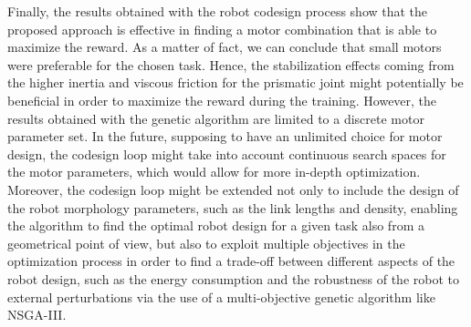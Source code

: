 Finally, the results obtained with the robot codesign process show that the proposed approach is effective in finding a motor combination that is able to maximize the reward. As a matter of fact, we can conclude that small motors were preferable for the chosen task. Hence, the stabilization effects coming from the higher inertia and viscous friction for the prismatic joint might potentially be beneficial in order to maximize the reward during the training. However, the results obtained with the genetic algorithm are limited to a discrete motor parameter set. In the future, supposing to have an unlimited choice for motor design, the codesign loop might take into account continuous search spaces for the motor parameters, which would allow for more in-depth optimization. Moreover, the codesign loop might be extended not only to include the design of the robot morphology parameters, such as the link lengths and density, enabling the algorithm to find the optimal robot design for a given task also from a geometrical point of view, but also to exploit multiple objectives in the optimization process in order to find a trade-off between different aspects of the robot design, such as the energy consumption and the robustness of the robot to external perturbations via the use of a multi-objective genetic algorithm like \ac{NSGA}-III.